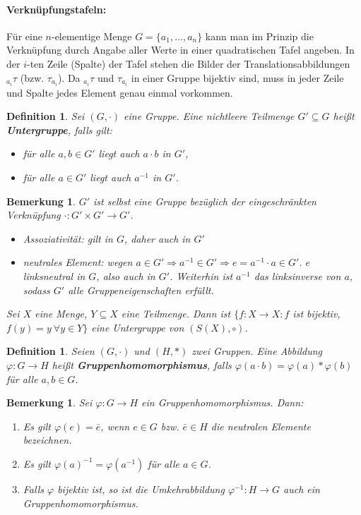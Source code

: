 \documentclass[12pt,a4paper]{article}
\theoremstyle{plain}
\newtheorem{Definition}[Theorem]{Definition}
\newtheorem{Bemerkung}[Theorem]{Bemerkung}
\newcommand{\herv}[1]{{\emph{\textbf{#1}}}}
\numberwithin{equation}{section}
\begin{document}
\paragraph{Verknüpfungstafeln:} Für eine $n$-elementige Menge $G=\{a_1,\ldots,a_n\}$ kann man im Prinzip die Verknüpfung durch Angabe aller Werte in einer quadratischen Tafel angeben. In der $i$-ten Zeile (Spalte) der Tafel stehen die Bilder der Translationsabbildungen ${}_{a_{i}}\tau$ (bzw. $\tau_{a_i}$). Da ${}_{a_{i}}\tau$ und $\tau_{a_i}$ in einer Gruppe bijektiv sind, muss in jeder Zeile und Spalte jedes Element genau einmal vorkommen.
\begin{Definition}
Sei $(G,\cdot)$ eine Gruppe. Eine nichtleere Teilmenge $G'\subseteq G$ heißt \herv{Untergruppe}, falls gilt:
\begin{itemize}
\item für alle $a,b\in G'$ liegt auch $a\cdot b$ in $G'$,
\item für alle $a\in G'$ liegt auch $a^{-1}$ in $G'$.
\end{itemize}
\end{Definition}
\begin{Bemerkung}
$G'$ ist selbst eine Gruppe bezüglich der eingeschränkten Verknüpfung $\cdot:G'\times G' \rightarrow G'$.
\begin{itemize}
\item Assoziativität: gilt in $G$, daher auch in $G'$
\item neutrales Element: wegen $a\in G' \Rightarrow a^{-1}\in G' \Rightarrow e=a^{-1}\cdot a\in G'$. $e$ linksneutral in $G$, also auch in $G'$. Weiterhin ist $a^{-1}$ das linksinverse von $a$, sodass $G'$ alle Gruppeneigenschaften erfüllt.
\end{itemize}
Sei $X$ eine Menge, $Y\subseteq X$ eine Teilmenge. Dann ist $\{f:X\rightarrow X: f$ ist bijektiv, $f(y)=y\ \forall y\in Y\}$ eine Untergruppe von $(S(X),\circ)$.
\end{Bemerkung}
\begin{Definition}
Seien $(G,\cdot)$ und $(H,*)$ zwei Gruppen. Eine Abbildung $\varphi: G\rightarrow H$ heißt \herv{Gruppenhomomorphismus}, falls $\varphi(a\cdot b)=\varphi(a)*\varphi(b)$ für alle $a,b\in G$.
\end{Definition}
\begin{Bemerkung}
Sei $\varphi:G\rightarrow H$ ein Gruppenhomomorphismus. Dann:
\begin{enumerate}
\renewcommand{\labelenumi}{(\alph{enumi})}
\item Es gilt $\varphi(e)=\bar{e}$, wenn $e\in G$ bzw. $\bar{e}\in H$ die neutralen Elemente bezeichnen.
\item Es gilt $\varphi(a)^{-1}=\varphi(a^{-1})$ für alle $a\in G$.
\item Falls $\varphi$ bijektiv ist, so ist die Umkehrabbildung $\varphi^{-1}:H\rightarrow G$ auch ein Gruppenhomomorphismus.
\end{enumerate}
\end{Bemerkung}
\end{document}
